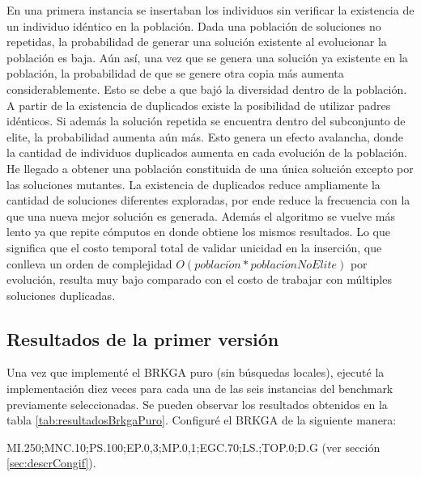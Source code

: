 \bigskip

En una primera instancia se insertaban los individuos sin verificar la existencia de un individuo idéntico en la población. Dada una población de soluciones no repetidas, la probabilidad de generar una solución existente al evolucionar la población es baja. Aún así, una vez que se genera una solución ya existente en la población, la probabilidad de que se genere otra copia más aumenta considerablemente. Esto se debe a que bajó la diversidad dentro de la población. A partir de la existencia de duplicados existe la posibilidad de utilizar padres idénticos. Si además la solución repetida se encuentra dentro del subconjunto de elite, la probabilidad aumenta aún más. Esto genera un efecto avalancha, donde la cantidad de individuos duplicados aumenta en cada evolución de la población. He llegado a obtener una población constituida de una única solución excepto por las soluciones mutantes. La existencia de duplicados reduce ampliamente la cantidad de soluciones diferentes exploradas, por ende reduce la frecuencia con la que una nueva mejor solución es generada. Además el algoritmo se vuelve más lento ya que repite cómputos en donde obtiene los mismos resultados. Lo que significa que el costo temporal total de validar unicidad en la inserción, que conlleva un orden de complejidad $O(poblaci\acute{o}n * poblaci\acute{o}nNoElite)$ por evolución, resulta muy bajo comparado con el costo de trabajar con múltiples soluciones duplicadas.

\subsection{Resultados de la primer versión}

Una vez que implementé el BRKGA puro (sin búsquedas locales), ejecuté la implementación diez veces para cada una de las seis instancias del benchmark previamente seleccionadas. Se pueden observar los resultados obtenidos en la tabla \ref{tab:resultadosBrkgaPuro}. Configuré el BRKGA de la siguiente manera: 

\bigskip

MI.250;MNC.10;PS.100;EP.0,3;MP.0,1;EGC.70;LS.;TOP.0;D.G (ver sección \ref{sec:descrCongif}).

\bigskip

